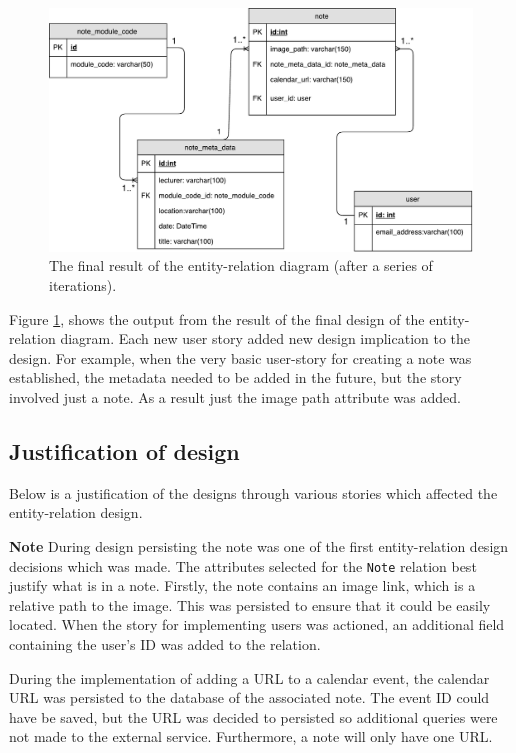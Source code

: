 \begin{figure}[H]
  \centering
  \includegraphics[scale=0.5]{images/database_diagram.pdf}
  \caption{The final result of the entity-relation diagram (after a series of iterations).}
  \label{fig:database}
\end{figure}

Figure \ref{fig:database}, shows the output from the result of the final design of the entity-relation diagram. Each new user story added new design implication to the design. For example, when the very basic user-story for creating a note was established, the metadata needed to be added in the future, but the story involved just a note. As a result just the image path attribute was added.

\subsection{Justification of design}
Below is a justification of the designs through various stories which affected the entity-relation design.

\noindent
\textbf{Note}
\newline
During design persisting the note was one of the first entity-relation design decisions which was made. The attributes selected for the \texttt{Note} relation best justify what is in a note. Firstly, the note contains an image link, which is a relative path to the image. This was persisted to ensure that it could be easily located. When the story for implementing users was actioned, an additional field containing the user's ID was added to the relation.

During the implementation of adding a URL to a calendar event, the calendar URL was persisted to the database of the associated note. The event ID could have be saved, but the URL was decided to persisted so additional queries were not made to the external service. Furthermore, a note will only have one URL.

